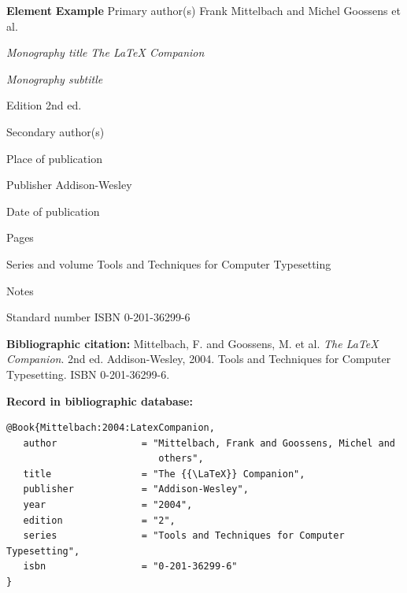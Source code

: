 
\newpage
\label{pr-monografie2}
\begin{tabbing}
\zarazky
\textbf{Element} \> \textbf{Example} \odradkovani
Primary author(s) \>
Frank {\sc Mittelbach} and Michel {\sc Goossens} et al.

\odradkovani
{\em Monography title} \>
{\em The {\LaTeX} Companion}

\odradkovani
{\em Monography subtitle}\footnotemark[1] \>

\odradkovani
Edition \>
2nd ed.

\odradkovani
Secondary author(s)\footnotemark[1] \>

\odradkovani
Place of publication \>

\odradkovani
Publisher \>
Addison-Wesley

\odradkovani
Date of publication 

\odradkovani
Pages \>

\odradkovani
Series and volume \>
Tools and Techniques for Computer Typesetting

\odradkovani
Notes\footnotemark[2] \>

\odradkovani
Standard number \>
ISBN 0-201-36299-6

\odradkovani
\end{tabbing}

\noindent \textbf{Bibliographic citation:} \odradkovani
{\sc Mittelbach}, F. and {\sc Goossens}, M. et al.
{\em The {\LaTeX} Companion}. 2nd ed. Addison-Wesley, 2004.
Tools and Techniques for Computer Typesetting. ISBN 0-201-36299-6.

\bigskip \bigskip
\noindent \textbf{Record in bibliographic database:}
\vspace{-0.5em}
\begin{verbatim}
@Book{Mittelbach:2004:LatexCompanion,
   author               = "Mittelbach, Frank and Goossens, Michel and
                           others",
   title                = "The {{\LaTeX}} Companion",
   publisher            = "Addison-Wesley",
   year                 = "2004",
   edition              = "2",
   series               = "Tools and Techniques for Computer Typesetting",
   isbn                 = "0-201-36299-6"
}
\end{verbatim}

